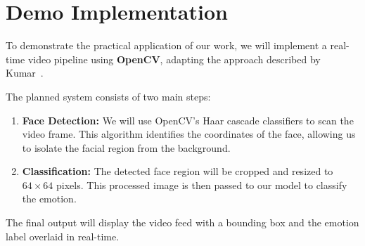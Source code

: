 \section{Demo Implementation}
\label{sec:demo}

To demonstrate the practical application of our work, we will implement a real-time video pipeline using \textbf{OpenCV}, adapting the approach described by Kumar~\cite{kumar2018demonstration}.

The planned system consists of two main steps:
\begin{enumerate}
    \item \textbf{Face Detection:} We will use OpenCV's Haar cascade classifiers to scan the video frame. This algorithm identifies the coordinates of the face, allowing us to isolate the facial region from the background.
    \item \textbf{Classification:} The detected face region will be cropped and resized to $64 \times 64$ pixels. This processed image is then passed to our model to classify the emotion.
\end{enumerate}

The final output will display the video feed with a bounding box and the emotion label overlaid in real-time.
